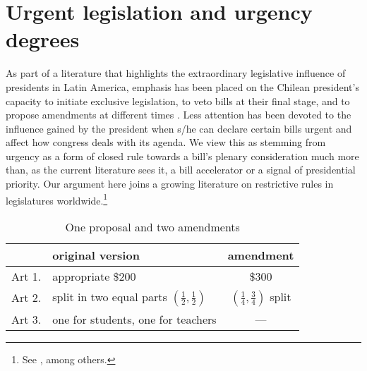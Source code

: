 \documentclass[letter,12pt]{article}
\begin{document}
\section{Urgent legislation and urgency degrees}

As part of a literature that highlights the extraordinary legislative influence of presidents in Latin America, emphasis has been placed on the Chilean president's capacity to initiate exclusive legislation, to veto bills at their final stage, and to propose amendments at different times \citep{baldez.carey.1999,aleman.navia.UrgChi.2009}. Less attention has been devoted to the influence gained by the president when s/he can declare certain bills urgent and affect how congress deals with its agenda. We view this as stemming from urgency as a form of closed rule towards a bill's plenary consideration much more than, as the current literature sees it, a bill accelerator or a signal of presidential priority. Our argument here joins a growing literature on restrictive rules in legislatures worldwide.\footnote{See \citet{dion.huber.1996,doring.restrictiveRules.2003,huber.1996a,krehbielRestrictiveRules1997,heller.2001,weingast.1992,schickler.richRules1997,cox.mccubbins.1997,amorim.cox.mccubbins.2003,calvo.2014argBook,sin.2014,denhartog.2004phd}, among others.} 

\begin{table}
\centering
\caption{One proposal and two amendments}\label{T:example}
\noindent \begin{tabular}{llc}
       & original version                   & amendment                                        \\ \hline
Art 1. & appropriate \$200                  & \$300                                            \\
Art 2. & split in two equal parts $(\frac{1}{2}, \frac{1}{2})$          & $(\frac{1}{4}, \frac{3}{4})$ split \\
Art 3. & one for students, one for teachers & ---                                              \\
\end{tabular}
\end{table}
\end{document}
